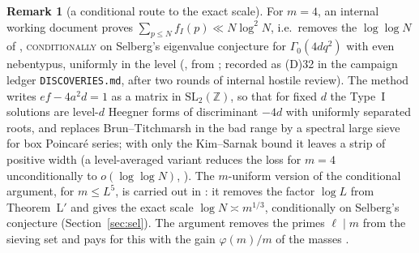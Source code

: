 \documentclass[10pt,reqno]{amsart}
\theoremstyle{definition}
\newtheorem{remark}[theorem]{Remark}
\newcommand{\Z}{\mathbb Z}
\newcommand{\status}[1]{\textup{\textsc{#1}}}
\begin{document}
\begin{remark}[a conditional route to the exact scale]\label{rem:sel}
For $m=4$, an internal working document \cite{TTL} proves
$\sum_{p\leq N}f_I(p)\ll N\log^2N$, i.e.\ removes the $\log\log N$ of
\cite[Thm.~1.1]{ET}, \status{conditionally} on Selberg's eigenvalue
conjecture for $\Gamma_0(4dq^2)$ with even nebentypus, uniformly in the
level (\cite[Thm.~8.2]{HN}, from \cite[Thm.~8.1]{TTL}; recorded as (D)32 in the campaign ledger %
\texttt{DISCOVERIES.md}, after two rounds of internal hostile review).
The method writes $ef-4a^2d=1$ as a matrix in $\mathrm{SL}_2(\Z)$, so
that for fixed $d$ the Type~I solutions are level-$d$ Heegner forms of
discriminant $-4d$ with uniformly separated roots, and replaces
Brun--Titchmarsh in the bad range by a spectral large sieve for box
Poincar\'e series; with only the Kim--Sarnak bound it leaves a strip of
positive width (a level-averaged variant reduces the loss for $m=4$
unconditionally to $o(\log\log N)$, \cite[Thm.~1]{HN}).  The $m$-uniform
version of the conditional argument, for $m\leq L^5$, is carried out in
\cite{MN4}: it removes the factor $\log L$ from Theorem~L$'$ and gives the
exact scale $\log N\asymp m^{1/3}$, conditionally on Selberg's
conjecture (Section~\ref{sec:sel}).  The argument removes the
primes $\ell\mid m$ from the sieving set and pays for this with the gain
$\varphi(m)/m$ of the masses \cite[remarks after Thm.~3.8]{MN3}.
\end{remark}
\end{document}
